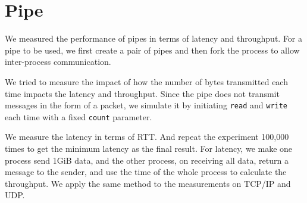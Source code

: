 \section{Pipe}

We measured the performance of pipes in terms of latency and throughput. For a pipe to be used, we first create a pair of pipes and then fork the process to allow inter-process communication.

We tried to measure the impact of how the number of bytes transmitted each time impacts the latency and throughput. Since the pipe does not transmit messages in the form of a packet, we simulate it by initiating \texttt{read} and \texttt{write} each time with a fixed \texttt{count} parameter.

We measure the latency in terms of RTT. And repeat the experiment 100,000 times to get the minimum latency as the final result. For latency, we make one process send 1GiB data, and the other process, on receiving all data, return a message to the sender, and use the time of the whole process to calculate the throughput. We apply the same method to the measurements on TCP/IP and UDP.
